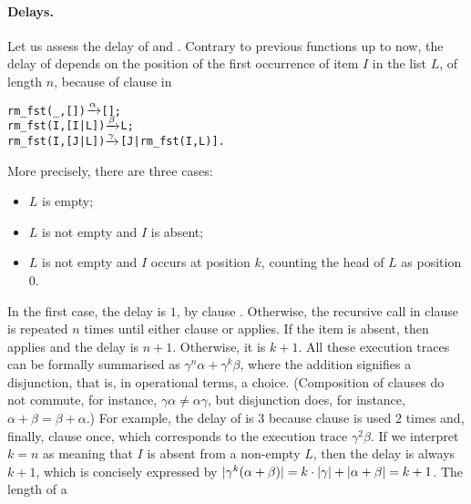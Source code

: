 \smallskip

\paragraph{Delays.}

Let us assess the delay of  and
. Contrary to previous functions up to now, the
delay of  depends on the position of the
first occurrence of item \(I\) in the list \(L\), of length \(n\),
because of clause \clause{\beta} in
\begin{alltt}
rm_fst(_,   []) \(\smashedrightarrow{\alpha}\) [];\hfill% \emph{Absent}
rm_fst(I,[I|L]) \(\smashedrightarrow{\beta}\) L;\hfill% \emph{Present}
rm_fst(I,[J|L]) \(\smashedrightarrow{\gamma}\) [J|rm_fst(I,L)].\hfill% \emph{Search further}
\end{alltt}
More precisely, there are three cases:
\begin{itemize}

  \item \(L\) is empty;

  \item \(L\) is not empty and \(I\) is absent;

  \item \(L\) is not empty and \(I\) occurs at position
    \(k\), counting the head of \(L\) as position \(0\).

\end{itemize}
In the first case, the delay is \(1\), by clause
\clause{\alpha}. Otherwise, the recursive call in clause
\clause{\gamma} is repeated \(n\) times until either clause
\clause{\alpha} or \clause{\beta} applies. If the item is absent, then
\clause{\alpha} applies and the delay is \(n+1\). Otherwise, it is
\(k+1\). All these execution traces can be formally summarised as
\(\gamma^n\alpha+\gamma^k\beta\), where the addition signifies a
disjunction, that is, in operational terms, a choice. (Composition of
clauses do not commute, for instance, \(\gamma\alpha \neq \alpha\gamma\), but
disjunction does, for instance, \(\alpha + \beta = \beta + \alpha\).) For
example, the delay of  is \(3\)
because clause \clause{\gamma} is used \(2\) times and, finally,
clause \clause{\beta} once, which corresponds to the execution trace
\(\gamma^2\beta\). If we interpret \(k=n\) as meaning that \(I\) is
absent from a non\hyp{}empty \(L\), then the delay is always \(k+1\),
which is concisely expressed by \(\lvert\gamma^k(\alpha+\beta)\rvert = k
\cdot \lvert\gamma\rvert + \lvert\alpha + \beta\rvert = k +1\). The length of a
